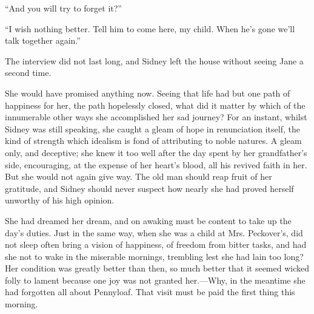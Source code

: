 ``And you will try to forget it?''

``I wish nothing better. Tell him to come here, my child. When he's gone
we'll talk together again.''

The interview did not last long, and Sidney {}left the house without
seeing Jane a second time.

She would have promised anything now. Seeing that life had but one path
of happiness for her, the path hopelessly closed, what did it matter by
which of the innumerable other ways she accomplished her sad journey?
For an instant, whilst Sidney was still speaking, she caught a gleam of
hope in renunciation itself, the kind of strength which idealism is fond
of attributing to noble natures. A gleam only, and deceptive; she knew
it too well after the day spent by her grandfather's side, encouraging,
at the expense of her heart's blood, all his revived faith in her. But
she would not again give way. The old man should reap fruit of her
gratitude, and Sidney should never suspect how nearly she had proved
herself unworthy of his high opinion.

She had dreamed her dream, and on awaking must be content to take up the
day's duties. Just in the same way, when she was a child at Mrs.
Peckover's, did not sleep often bring a vision of happiness, of freedom
from bitter tasks, and had she not to wake in the {}miserable mornings,
trembling lest she had lain too long? Her condition was greatly better
than then, so much better that it seemed wicked folly to lament because
one joy was not granted her.---Why, in the meantime she had forgotten
all about Pennyloaf. That visit must be paid the first thing this
morning.
